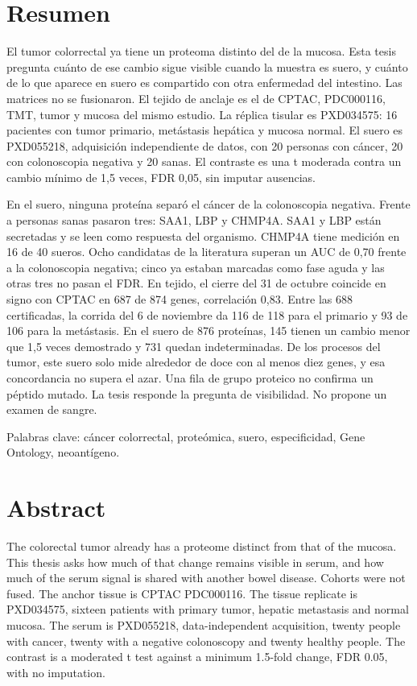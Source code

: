 \documentclass[12pt,oneside]{report}
\begin{document}
\chapter*{Resumen}
El tumor colorrectal ya tiene un proteoma distinto del de la mucosa. Esta tesis pregunta cuánto de ese cambio sigue visible cuando la muestra es suero, y cuánto de lo que aparece en suero es compartido con otra enfermedad del intestino. Las matrices no se fusionaron. El tejido de anclaje es el de CPTAC, PDC000116, TMT, tumor y mucosa del mismo estudio. La réplica tisular es PXD034575: 16 pacientes con tumor primario, metástasis hepática y mucosa normal. El suero es PXD055218, adquisición independiente de datos, con 20 personas con cáncer, 20 con colonoscopia negativa y 20 sanas. El contraste es una t moderada contra un cambio mínimo de 1,5 veces, FDR 0,05, sin imputar ausencias.

En el suero, ninguna proteína separó el cáncer de la colonoscopia negativa. Frente a personas sanas pasaron tres: SAA1, LBP y CHMP4A. SAA1 y LBP están secretadas y se leen como respuesta del organismo. CHMP4A tiene medición en 16 de 40 sueros. Ocho candidatas de la literatura superan un AUC de 0,70 frente a la colonoscopia negativa; cinco ya estaban marcadas como fase aguda y las otras tres no pasan el FDR. En tejido, el cierre del 31 de octubre coincide en signo con CPTAC en 687 de 874 genes, correlación 0,83. Entre las 688 certificadas, la corrida del 6 de noviembre da 116 de 118 para el primario y 93 de 106 para la metástasis. En el suero de 876 proteínas, 145 tienen un cambio menor que 1,5 veces demostrado y 731 quedan indeterminadas. De los procesos del tumor, este suero solo mide alrededor de doce con al menos diez genes, y esa concordancia no supera el azar. Una fila de grupo proteico no confirma un péptido mutado. La tesis responde la pregunta de visibilidad. No propone un examen de sangre.

Palabras clave: cáncer colorrectal, proteómica, suero, especificidad, Gene Ontology, neoantígeno.

\chapter*{Abstract}
The colorectal tumor already has a proteome distinct from that of the mucosa. This thesis asks how much of that change remains visible in serum, and how much of the serum signal is shared with another bowel disease. Cohorts were not fused. The anchor tissue is CPTAC PDC000116. The tissue replicate is PXD034575, sixteen patients with primary tumor, hepatic metastasis and normal mucosa. The serum is PXD055218, data-independent acquisition, twenty people with cancer, twenty with a negative colonoscopy and twenty healthy people. The contrast is a moderated t test against a minimum 1.5-fold change, FDR 0.05, with no imputation.
\end{document}

